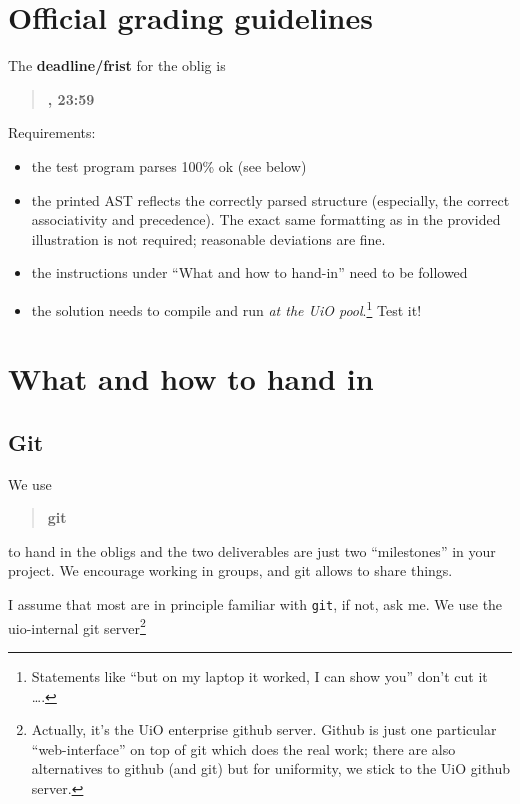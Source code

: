 \documentclass[10pt,freeform]{handout}[2014/08/13]
\begin{document}
\thispagestyle{empty}

\section{Official grading guidelines}
\label{sec:official-info}




\hrulefill{}

The \textbf{deadline/frist}  for the oblig is

\begin{quote}
  \textbf{\deadlineone, 23:59}
\end{quote}

Requirements:


\begin{itemize}
\item the test program parses 100\% ok (see below)
\item the printed AST reflects the correctly parsed structure (especially,
  the correct associativity and precedence). The exact same formatting as
  in the provided illustration is not required; reasonable deviations are
  fine.
\item the instructions under ``What and how to  hand-in'' need to be followed
\item the solution needs to compile and run \emph{at the UiO
    pool}.\footnote{Statements like ``but on my laptop it worked, I can show
    you'' don't cut it \ldots.} Test it!
\end{itemize}

\hrulefill




\section{What and how to hand in}
\label{sec:what-how}


\subsection{Git}
\label{sec:git}



We use
\begin{quote}
  \textbf{git}   
\end{quote}
to hand in the obligs and the two deliverables are just two ``milestones''
in your project. We encourage working in groups, and git allows to share
things.

I assume that most are in principle familiar with \texttt{git}, if not, ask
me.  We use the uio-internal git server\footnote{Actually, it's the UiO
  enterprise github server. Github is just one particular ``web-interface''
  on top of git which does the real work; there are also alternatives to
  github (and git) but for uniformity, we stick to the UiO github server.}
\end{document}
